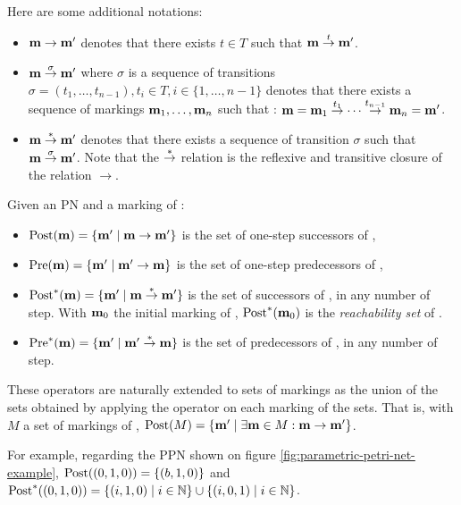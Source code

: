 Here are some additional notations:
\begin{itemize}
  \item $\mathbf{m} \rightarrow \mathbf{m'}$ denotes that there exists $t \in T$ such that $\mathbf{m} \stackrel{t}{\to} \mathbf{m'}$.
  \item $\mathbf{m} \stackrel{\sigma}{\to} \mathbf{m'}$ where $\sigma$ is a sequence of transitions $\sigma = (t_1, \dots, t_{n-1}), t_i \in T, i \in \{1, \dots, n-1\}$ denotes that there exists a sequence of markings $\mathbf{m}_1, \dots, \mathbf{m}_n$ such that : $\mathbf{m} = \mathbf{m}_1 \stackrel{t_1}{\to} \cdots \stackrel{t_{n-1}}{\to} \mathbf{m}_n = \mathbf{m'}$.
  \item $\mathbf{m} \stackrel{*}{\to} \mathbf{m'}$ denotes that there exists a sequence of transition $\sigma$ such that $\mathbf{m} \stackrel{\sigma}{\to} \mathbf{m'}$.
    Note that the $\stackrel{*}{\to}$ relation is the reflexive and transitive closure of the relation $\rightarrow$.
\end{itemize}

\begin{defi}
  Given an \ac{PN} \NPT and a marking \mar of \PN:
  \begin{itemize}
    \item $\operatorname{Post}(\mathbf{m}) = \{\mathbf{m'} \mid \mathbf{m} \rightarrow \mathbf{m'}\}$ is the set of one-step successors of \mar,
    \item $\operatorname{Pre}(\mathbf{m}) = \{\mathbf{m'} \mid \mathbf{m'} \rightarrow \mathbf{m}\}$ is the set of one-step predecessors of \mar,
    \item $\operatorname{Post}^*(\mathbf{m}) = \{\mathbf{m'} \mid \mathbf{m} \stackrel{*}{\to} \mathbf{m'}\}$ is the set of successors of \mar, in any number of step.
      With $\mathbf{m}_0$ the initial marking of \PN, $\operatorname{Post}^*(\mathbf{m}_0)$ is the \emph{reachability set} of \PN.
    \item $\operatorname{Pre}^*(\mathbf{m}) = \{\mathbf{m'} \mid \mathbf{m'} \stackrel{*}{\to} \mathbf{m}\}$ is the set of predecessors of \mar, in any number of step.
  \end{itemize}
\end{defi}

These operators are naturally extended to sets of markings as the union of the sets obtained by applying the operator on each marking of the sets.
That is, with $M$ a set of markings of \PN,
$\operatorname{Post}(M) = \{\mathbf{m'} \mid \exists \mathbf{m} \in M : \mathbf{m} \rightarrow \mathbf{m'}\}$.

For example, regarding the \ac{PPN} shown on figure \ref{fig:parametric-petri-net-example},
$\operatorname{Post}((0,1,0)) = \{(b, 1, 0)\}$
and
$\operatorname{Post}^*((0,1,0)) = \{(i, 1, 0) \mid i \in \mathbb{N}\} \cup \{(i, 0, 1) \mid i \in \mathbb{N}\}$.

